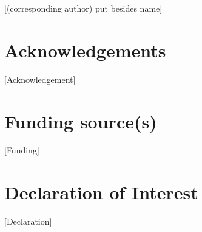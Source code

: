 \documentclass[10pt]{article}
\newcommand{\AddMore}[1]{{\color{red}[#1]}}
\begin{document}
\AddMore{(corresponding author) put besides name}


\section{Acknowledgements}
\AddMore{Acknowledgement}

\section{Funding source(s)}
\AddMore{Funding}

\section{Declaration of Interest}
\AddMore{Declaration}

\end{document}
